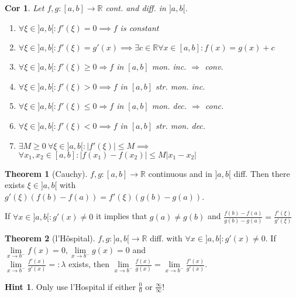 \documentclass[a4paper, 10pt]{article}
\newtheorem*{corollary}{Cor}
\theoremstyle{definition}
\newtheorem*{note_wrapper}{Hint}
\theoremstyle{named}
\newtheorem*{ntheorem_wrapper}{Theorem}
\newenvironment{ntheorem}%
    {\begin{mdframed}[style=important]\begin{ntheorem_wrapper}}%
    {\end{ntheorem_wrapper}\end{mdframed}}
\newenvironment{note}%
    {\begin{mdframed}[style=trick]\begin{note_wrapper}}%
    {\end{note_wrapper}\end{mdframed}}
\newcommand{\R}{\mathbb{R}}
\begin{document}
\begin{corollary}
    Let $f, g: [a, b] \to \R$ cont. and diff. in $]a, b[$.
    \begin{enumerate}
        \item $\forall \xi \in ]a, b[: f'(\xi) = 0 \implies f$ is constant
        \item $\forall \xi \in ]a, b[: f'(\xi) = g'(x) \implies \exists c \in \R \forall x \in [a, b] : f(x) = g(x) + c$
        \item $\forall \xi \in ]a, b[: f'(\xi) \geq 0 \Rightarrow f$ in $[a, b]$ mon. inc. $\Rightarrow$ conv.
        \item $\forall \xi \in ]a, b[: f'(\xi) > 0 \implies f$ in $[a, b]$ str. mon. inc.
        \item $\forall \xi \in ]a, b[: f'(\xi) \leq 0 \Rightarrow f$ in $[a, b]$ mon. dec. $\Rightarrow$ conc.
        \item $\forall \xi \in ]a, b[: f'(\xi) < 0 \implies f$ in $[a, b]$ str. mon. dec.
        \item $\exists M \geq 0 \ \forall \xi \in ]a, b[ : |f'(\xi)| \leq M \implies$ \newline $\forall x_1, x_2 \in [a, b]: |f(x_1) - f(x_2)| \leq M |x_1 - x_2|$
    \end{enumerate}
\end{corollary}

\begin{ntheorem}[Cauchy]
    $f, g: [a, b] \to \R$ continuous and in $]a, b[$ diff. Then there exists $\xi \in ]a, b[$ with \\
    $g'(\xi)(f(b) - f(a)) = f'(\xi)(g(b) - g(a))$.

    If $\forall x \in ]a, b[ : g'(x) \neq 0$ it implies that $g(a) \neq g(b)$ and $\frac{f(b) - f(a)}{g(b) - g(a)} = \frac{f'(\xi)}{g'(\xi)}$
\end{ntheorem}

\begin{ntheorem}[l'Hôspital]
    $f,g : ]a, b[ \to \R$ diff. with $\forall x \in ]a, b[ : g'(x) \neq 0$.
    If $\lim\limits_{x \to b^-} f(x) = 0, \lim\limits_{x \to b^-} g(x) = 0$ and \\
    $\lim\limits_{x \to b^-} \frac{f'(x)}{g'(x)} =: \lambda$ exists, then $\lim\limits_{x \to b^-}\frac{f(x)}{g(x)} = \lim\limits_{x \to b^-}\frac{f'(x)}{g'(x)}$.
\end{ntheorem}

\begin{note}
    Only use l'Hospital if either $\frac{0}{0}$ or $\frac{\infty}{\infty}$!
\end{note}
\end{document}
